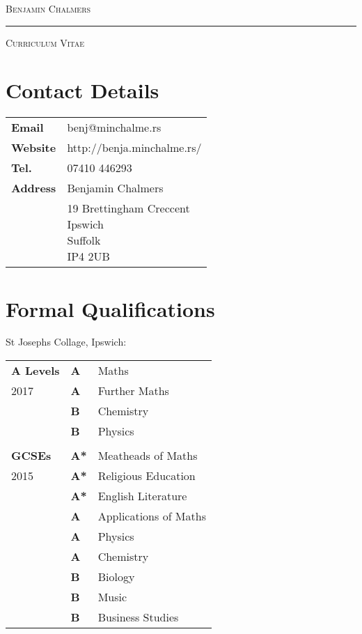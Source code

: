 \documentclass[9pt,a4paper]{article}
\begin{document}
\begin{center}

  \textsc{\Huge{Benjamin Chalmers}}
  \vspace{0.3cm}

  \noindent\rule{0.8\textwidth}{0.4pt}
  \vspace{0.3cm}

  \textsc{\large{Curriculum Vitae}}
  \vspace{0.2cm}

\end{center}
\begin{multicols*}{2}
  \section*{Contact Details} 
\begin{center}
  \begin{tabular}{p{2cm}p{6cm}}
    \textbf{Email}&benj@minchalme.rs\\
    \textbf{Website}&http://benja.minchalme.rs/\\
    \textbf{Tel.}&07410 446293\\
    \textbf{Address}&Benjamin Chalmers\\
    &\parbox{5cm}{19 Brettingham Creccent\\Ipswich\\Suffolk\\IP4 2UB}\\
  \end{tabular}
\end{center}

  \section*{Formal Qualifications}
  \vspace*{-.3cm}
  St Josephs Collage, Ipswich:
  \vspace*{-.6cm}
\begin{center}
  \begin{tabular}{p{2cm} p{0.6cm} p{5.4cm}}
    \textbf{A Levels}&\textbf{A}&Maths\\
	2017&\textbf{A}&Further Maths\\
	    &\textbf{B}&Chemistry\\
	    &\textbf{B}&Physics\\
\\
    \textbf{GCSEs}&\textbf{A*}&Meatheads of Maths\\
	2015&\textbf{A*}&Religious Education\\
	    &\textbf{A*}&English Literature\\
 	    &\textbf{A}&Applications of Maths\\
	    &\textbf{A}&Physics\\
	    &\textbf{A}&Chemistry\\
	    &\textbf{B}&Biology\\
	    &\textbf{B}&Music\\
	    &\textbf{B}&Business Studies\\
  \end{tabular}
\end{center}


\end{multicols*}
\end{document}
